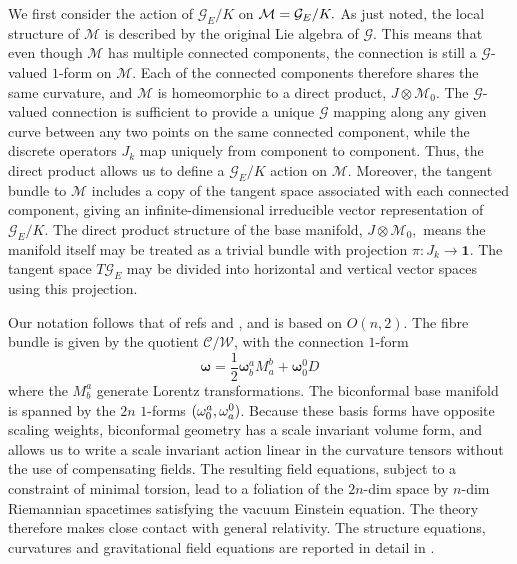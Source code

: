 \documentclass[a4paper,12pt]{article}
\begin{document}
We first consider the action of $\mathcal{G}_{E}/K$ on $\mathcal{M}=\mathcal{%
G}_{E}/K.$ As just noted, the local structure of $\mathcal{M}$ is described
by the original Lie algebra of $\mathcal{G}.$ This means that even though $%
\mathcal{M}$ has multiple connected components, the connection is still a $%
\mathcal{G}$-valued $1$-form on $\mathcal{M}.$ Each of the connected
components therefore shares the same curvature, and $\mathcal{M}$ is
homeomorphic to a direct product, $J\otimes \mathcal{M}_{0}.$ The $\mathcal{G%
}$-valued connection is sufficient to provide a unique $\mathcal{G}$ mapping
along any given curve between any two points on the same connected
component, while the discrete operators $J_{k}$ map uniquely from component
to component. Thus, the direct product allows us to define a $\mathcal{G}%
_{E}/K$ action on $\mathcal{M}.$ Moreover, the tangent bundle to $\mathcal{M}
$ includes a copy of the tangent space associated with each connected
component, giving an infinite-dimensional irreducible vector representation
of $\mathcal{G}_{E}/K$. The direct product structure of the base manifold, $%
J\otimes \mathcal{M}_{0},$ means the manifold itself may be treated as a
trivial bundle with projection $\pi :J_{k}\rightarrow \mathbf{1.}$ The
tangent space $T\mathcal{G}_{E}$ may be divided into horizontal and vertical
vector spaces using this projection.

Our notation follows that of refs \cite{New Conformal Gauging Paper} and 
\cite{WWI}, and is based on $O(n,2)$. The fibre bundle is given by the
quotient $\mathcal{C}/\mathcal{W}$, with the connection $1$-form 
\begin{equation}
\mathbf{\omega =}\frac{1}{2}\mathbf{\omega }_{b}^{a}M_{a}^{b}+\mathbf{\omega 
}_{0}^{0}D
\end{equation}
where the $M_{b}^{a}$ generate Lorentz transformations. The biconformal base
manifold is spanned by the $2n$ $1$-forms $(\mathbf{\omega }_{0}^{a},\mathbf{%
\omega }_{a}^{0})$. Because these basis forms have opposite scaling weights,
biconformal geometry has a scale invariant volume form, and allows us to
write a scale invariant action linear in the curvature tensors without the
use of compensating fields. The resulting field equations, subject to a
constraint of minimal torsion, lead to a foliation of the $2n$-dim space by $
n$-dim Riemannian spacetimes satisfying the vacuum Einstein equation. The
theory therefore makes close contact with general relativity. The structure
equations, curvatures and gravitational field equations are reported in
detail in \cite{WWI}.
\end{document}
